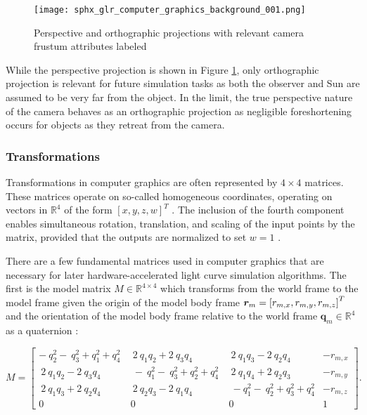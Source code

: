 \begin{figure}[!htb]
  \centering
  \texttt{[image: sphx\_glr\_computer\_graphics\_background\_001.png]}
  \caption{Perspective and orthographic projections with relevant camera frustum attributes labeled}
  \label{fig:ortho_perspective_cameras}
\end{figure}

While the perspective projection is shown in Figure \ref{fig:ortho_perspective_cameras}, only orthographic projection is relevant for future simulation tasks as both the observer and Sun are assumed to be very far from the object. In the limit, the true perspective nature of the camera behaves as an orthographic projection as negligible foreshortening occurs for objects as they retreat from the camera. 

\subsubsection{Transformations} \label{sec:graphics_trans}

Transformations in computer graphics are often represented by $4 \times 4$ matrices. These matrices operate on so-called homogeneous coordinates, operating on vectors in $\mathbb{R}^4$ of the form $\left[ x, y, z, w \right]^T$ \cite{shirley2009}. The inclusion of the fourth component enables simultaneous rotation, translation, and scaling of the input points by the matrix, provided that the outputs are normalized to set $w = 1$ \cite{shirley2009}.

There are a few fundamental matrices used in computer graphics that are necessary for later hardware-accelerated light curve simulation algorithms. The first is the model matrix $M \in \mathbb{R}^{4 \times 4}$ which transforms from the world frame to the model frame given the origin of the model body frame $\bm{r}_m = \left[ r_{m,x}, r_{m,y}, r_{m,z} \right]^T$ and the orientation of the model body frame relative to the world frame $\mathbf{q}_m \in \mathbb{R}^4$ as a quaternion \cite{shirley2009}:

\begin{equation} \label{eq:model_matrix}
  M = \begin{bmatrix}
    -\ q_2^2-\ q_3^2+q_1^2+q_4^2\ &\ 2\ q_1q_2+2\ q_3q_4&\ 2\ q_1q_3-2\ q_2q_4 & -r_{m,x}\\
    \ 2\ q_1q_2-2\ q_3q_4&\ -\ q_1^2-\ q_3^2+q_2^2+q_4^2\ &\ 2\ q_1q_4+2\ q_2q_3 & -r_{m,y}\\
    \ 2\ q_1q_3+2\ q_2q_4&\ 2\ q_2q_3-2\ q_1q_4&\ -q_1^2-\ q_2^2+q_3^2+q_4^2 & -r_{m,z} \\
    0 & 0 & 0 & 1
  \end{bmatrix}.
\end{equation}

